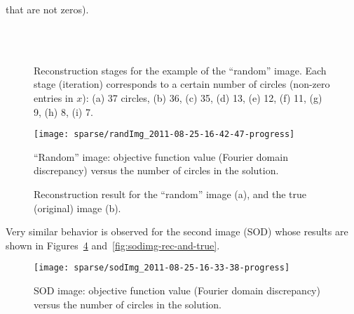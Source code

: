 that are not zeros).
\begin{figure}[H]
  \centering
  \\
  \\
  \caption[Reconstruction stages for the example of the ``random''
    image]{Reconstruction stages for the example of the ``random''
    image. Each stage (iteration) corresponds to a certain number of
    circles (non-zero entries in $x$): (a) 37 circles, (b) 36, (c) 35,
    (d) 13, (e) 12, (f) 11, (g) 9, (h) 8, (i) 7.}
  \label{fig:randomimg-rec-stages}
\end{figure}
\begin{figure}[H]
  \centering
  \texttt{[image: sparse/randImg\_2011-08-25-16-42-47-progress]}
  \caption[``Random'' image: objective function value]{``Random'' image: objective function value (Fourier domain
    discrepancy) versus the number of circles in the solution.}
  \label{fig:randomimg-objfunction}
\end{figure}

\begin{figure}[H]
  \centering
  \qquad{}
  \caption[Reconstruction result for the ``random'' image]{Reconstruction result for the ``random'' image (a), and the
    true (original) image (b).}
  \label{fig:randimg-rec-and-true}
\end{figure}
Very similar behavior is
observed for the second image (SOD) whose results are shown in
Figures~\ref{fig:sodimg-objfunction}
and~\ref{fig:sodimg-rec-and-true}.
\begin{figure}[H]
  \centering
  \texttt{[image: sparse/sodImg\_2011-08-25-16-33-38-progress]}
  \caption[SOD image: objective function value]{SOD image: objective function value (Fourier domain
    discrepancy) versus the number of circles in the solution.}
  \label{fig:sodimg-objfunction}
\end{figure}

